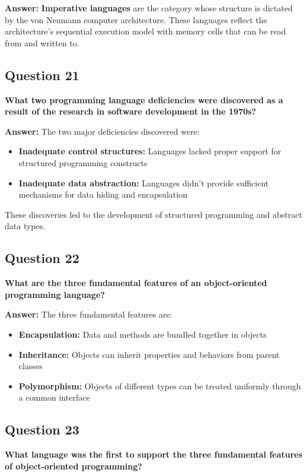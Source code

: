 \documentclass[11pt,a4paper]{article}
\begin{document}
\textbf{Answer:}
\textbf{Imperative languages} are the category whose structure is dictated by the von Neumann computer architecture. These languages reflect the architecture's sequential execution model with memory cells that can be read from and written to.

\subsection{Question 21}
\textbf{What two programming language deficiencies were discovered as a result of the research in software development in the 1970s?}

\textbf{Answer:}
The two major deficiencies discovered were:

\begin{itemize}
\item \textbf{Inadequate control structures:} Languages lacked proper support for structured programming constructs
\item \textbf{Inadequate data abstraction:} Languages didn't provide sufficient mechanisms for data hiding and encapsulation
\end{itemize}

These discoveries led to the development of structured programming and abstract data types.

\subsection{Question 22}
\textbf{What are the three fundamental features of an object-oriented programming language?}

\textbf{Answer:}
The three fundamental features are:

\begin{itemize}
\item \textbf{Encapsulation:} Data and methods are bundled together in objects
\item \textbf{Inheritance:} Objects can inherit properties and behaviors from parent classes
\item \textbf{Polymorphism:} Objects of different types can be treated uniformly through a common interface
\end{itemize}

\subsection{Question 23}
\textbf{What language was the first to support the three fundamental features of object-oriented programming?}
\end{document}
